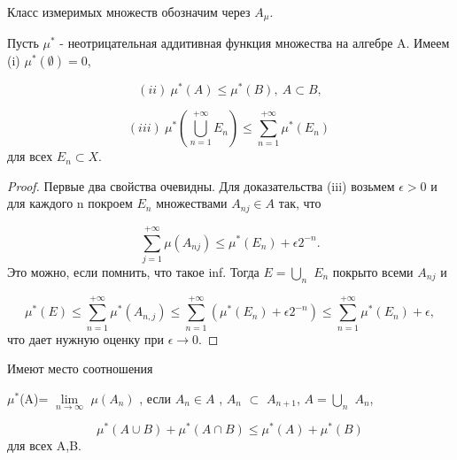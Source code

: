 Класс измеримых множеств обозначим через $A_\mu$.

\begin{lemma} Пусть $\mu^*$ - неотрицательная аддитивная функция множества на алгебре A. Имеем (i) $\mu^* (\emptyset) = 0$,

$$(ii)\  \mu^*(A) \leq \mu^*(B),\  A \subset B, $$

$$(iii)\  \mu^*(\bigcup_{n= 1}^{+\infty} E_n) \leq \sum_{n= 1}^{+\infty} \mu^* (E_n)\ $$ для всех $E_n \subset X$. 
\end{lemma}

\begin{proof} Первые два свойства очевидны. Для доказательства (iii) возьмем $\epsilon > 0$ и для каждого n покроем $E_n$ множествами $A_{nj} \in A$ так, что

$$ \sum_{j=1}^{+\infty} \mu(A_{nj} ) \leq \mu^* (E_n ) + \epsilon2^{-n} .  $$
Это можно, если помнить, что такое inf. Тогда $E =\bigcup_n$ $E_n$  покрыто всеми $A_{nj}$ и

$$ \mu^*(E) \leq  \sum_{n= 1}^{+\infty} \mu^*(A_{n,j} ) \leq \sum_{n= 1}^{+\infty}(\mu^*(E_n) + \epsilon2^{-n}) \leq \sum_{n= 1}^{+\infty} \mu^*(E_n) + \epsilon, $$
что дает нужную оценку при $\epsilon \rightarrow 0.$
\end{proof}


\begin{lemma} Имеют место соотношения 

 $\mu^*$(A)= $\lim\limits_{n\to \infty}$ $\mu(A_n)$ , если $A_n \in A$ , $A_n$ $\subset$ $A_{n+1}$, $A=\bigcup_n$ $A_n$,

$$ \mu^*(A\cup B)+\mu^*(A \cap B)\leq \mu^*(A)+\mu^*(B)$$ для всех A,B.
\end{lemma}


